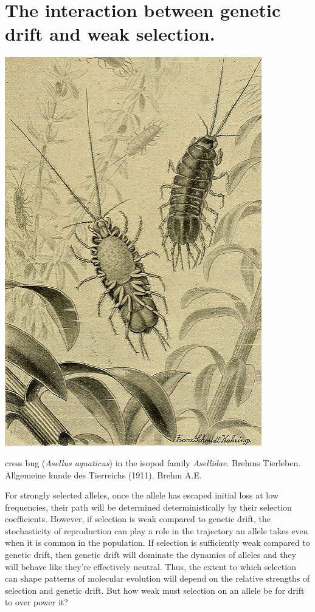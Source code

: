 \section{The interaction between genetic drift and weak selection.}
 \begin{marginfigure}
 \begin{center}
 \includegraphics[width=0.7 \textwidth]{illustration_images/Genetic_drift_selection/Isopod_Asellidae/20406697312_1a9aa75024_z.jpg}
 \end{center}
 \caption{cress bug ({\it Asellus aquaticus}) in the isopod family
   {\it Asellidae}. Brehms Tierleben. Allgemeine kunde des Tierreichs (1911).  Brehm A.E.} \label{fig: asellid_isopod}
 \end{marginfigure}
For strongly selected alleles, once the allele has escaped initial
loss at low frequencies, their path will be determined deterministically by their
selection coefficients. However, if selection is weak compared to
genetic drift, the stochasticity of reproduction can play a role in the trajectory an
allele takes even when it is common in the population. If selection is
sufficiently weak compared to genetic drift, then genetic drift will dominate the dynamics of alleles
and they will behave like they're effectively neutral. Thus, the extent
to which selection can shape patterns of molecular evolution will
depend on the relative strengths of selection and genetic drift.
But how weak must selection on an allele be for drift to over power
it? 

